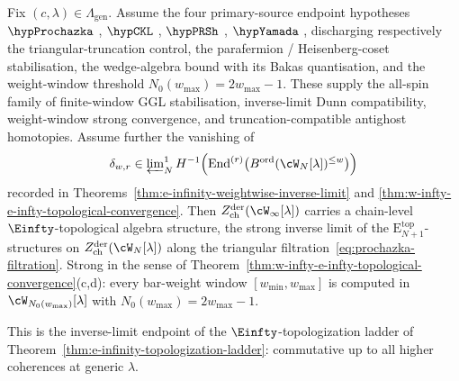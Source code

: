 \begin{theorem}
\label{thm:w-infty-e-infty-topologization-endpoint}
Fix $(c, \lambda) \in \Lambda_{\mathrm{gen}}$. Assume the four
primary-source endpoint hypotheses $\hypProchazka$
\textup{\cite{ProchazkaRapcak18}}, $\hypCKL$
\textup{\cite{CKL-parafermion}}, $\hypPRSh$
\textup{\cite{PopeRomansShen-winfty-wedge,Bakas-Winfty}}, $\hypYamada$
\textup{\cite{Yamada}}, discharging respectively the
triangular-truncation control, the parafermion / Heisenberg-coset
stabilisation, the wedge-algebra bound with its Bakas quantisation,
and the weight-window threshold $N_0(w_{\max}) = 2 w_{\max} - 1$. These
supply the all-spin family of finite-window GGL stabilisation,
inverse-limit Dunn compatibility, weight-window strong convergence,
and truncation-compatible antighost homotopies. Assume further the
vanishing of
\[
 \delta_{w,r}\in
 \varprojlim\nolimits_N^{1}
 H^{-1}\!\left(\operatorname{End}^{(r)}
 \bigl(B^{\mathrm{ord}}(\cW_N[\lambda])^{\le w}\bigr)\right)
\]
recorded in
Theorems~\textup{\ref{thm:e-infinity-weightwise-inverse-limit}} and
\textup{\ref{thm:w-infty-e-infty-topological-convergence}}. Then
$Z^{\mathrm{der}}_{\mathrm{ch}}(\cW_\infty[\lambda])$ carries a
chain-level $\Einfty$-topological algebra structure, the strong
inverse limit of the
$\mathrm{E}_{N+1}^{\mathrm{top}}$-structures on
$Z^{\mathrm{der}}_{\mathrm{ch}}(\cW_N[\lambda])$ along the
triangular filtration~\eqref{eq:prochazka-filtration}. Strong in
the sense of
Theorem~\textup{\ref{thm:w-infty-e-infty-topological-convergence}}(c,d):
every bar-weight window $[w_{\min}, w_{\max}]$ is computed in
$\cW_{N_0(w_{\max})}[\lambda]$ with
$N_0(w_{\max}) = 2 w_{\max} - 1$.

This is the inverse-limit endpoint of the
$\Einfty$-topologization ladder of
Theorem~\textup{\ref{thm:e-infinity-topologization-ladder}}:
commutative up to all higher coherences at generic $\lambda$.
\end{theorem}


